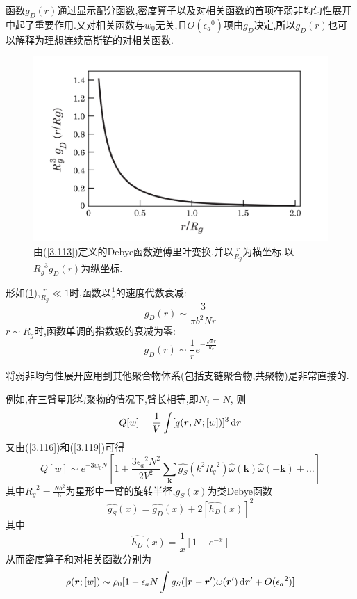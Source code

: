 函数$g_D(r)$通过显示配分函数,密度算子以及对相关函数的首项在弱非均匀性展开中起了重要作用.又对相关函数与$w_0$无关,且$O({\epsilon_a}^0)$项由$g_D$决定,所以$g_D(r)$也可以解释为理想连续高斯链的对相关函数.
\begin{figure}[H]
	\centering
	\includegraphics[scale=0.4]{Contents/chapter3/figures/FIG3-9.png}
	\caption{由(\ref{3.113})定义的Debye函数逆傅里叶变换,并以$\frac{r}{R_g}$为横坐标,以${R_g}^3 g_D(r)$为纵坐标.}
	\label{FIG3.9}
\end{figure}

形如(\ref{FIG3.9}),$\frac{r}{R_g} \ll 1$时,函数以$\frac{1}{r}$的速度代数衰减:
\begin{equation}
g_D(r) \sim \frac{3}{\pi b^2 N r}
\end{equation}
$r \sim R_g$时,函数单调的指数级的衰减为零:
$$g_D(r) \sim \frac{1}{r} e^{-\frac{\sqrt{3}r}{R_g}}$$

将弱非均匀性展开应用到其他聚合物体系(包括支链聚合物,共聚物)是非常直接的.

例如,在三臂星形均聚物的情况下,臂长相等,即$N_j = N$,
则
\begin{equation}
Q[w] = \frac{1}{V} \int [q(\bm{r} ,N;[w])]^3\,\mathrm{d} \bm{r} 
\end{equation}
又由(\ref{3.116})和(\ref{3.119})可得
\begin{equation}
Q[w] \sim e^{-3w_0 N} [1+\frac{3 {\epsilon_a}^2 N^2}{2V^2} \sum_{\mathbf{k}} \hat{g_S}(k^2 {R_g}^2)\hat{\omega}(\mathbf{k})\hat{\omega}(-\mathbf{k})+\dots]
\end{equation}
其中${R_g}^2 = \frac{Nb^2}{6}$为星形中一臂的旋转半径,$g_S(x)$为类Debye函数
\begin{equation}
\hat{g_S}(x) = \hat{g_D}(x) + 2[\hat{h_D}(x)]^2
\end{equation}
其中
\begin{equation}
\hat{h_D}(x) = \frac{1}{x} [1-e^{-x}]
\end{equation}
从而密度算子和对相关函数分别为
\begin{equation}
\rho(\bm{r} ;[w]) \sim \rho_0[1-\epsilon_a N \int g_S(|\bm{r} -\bm{r} ') \omega(\bm{r} ')\,\mathrm{d} \bm{r} '+O({\epsilon_a}^2)]
\end{equation}

